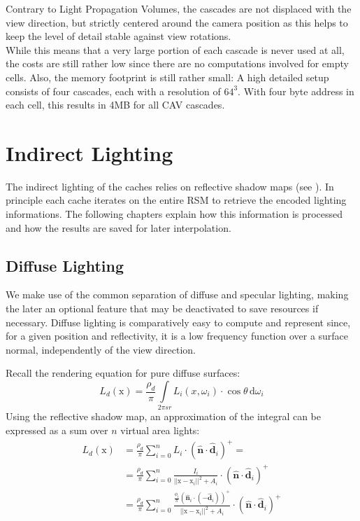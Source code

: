 \documentclass[thesis.tex]{subfiles}
\begin{document}
Contrary to Light Propagation Volumes, the cascades are not displaced with the view direction, but strictly centered around the camera position as this helps to keep the level of detail stable against view rotations.\\
While this means that a very large portion of each cascade is never used at all, the costs are still rather low since there are no computations involved for empty cells.
Also, the memory footprint is still rather small: %
A high detailed setup consists of four cascades, each with a resolution of $64^3$.
With four byte address in each cell, this results in 4MB for all CAV cascades.

\section{Indirect Lighting}
The indirect lighting of the caches relies on reflective shadow maps (see ).
In principle each cache iterates on the entire RSM to retrieve the encoded lighting informations.
The following chapters explain how this information is processed and how the results are saved for later interpolation.

\subsection{Diffuse Lighting}
We make use of the common separation of diffuse and specular lighting, making the later an optional feature that may be deactivated to save resources if necessary. 
Diffuse lighting is comparatively easy to compute and represent since, for a given position and reflectivity, it is a low frequency function over a surface normal, independently of the view direction.

Recall the rendering equation for pure diffuse surfaces:
\begin{equation}
L_d (\mathrm{x}) = \frac{\rho_d}{\pi}\int\limits_{2\pi sr} L_i(x,\omega_i) \cdot \cos\theta \,\mathrm{d}\omega_i
\end{equation}
Using the reflective shadow map, an approximation of the integral can be expressed as a sum over $n$ virtual area lights:
\begin{align}
L_d (\mathrm{x})
&=\frac{\rho_d}{\pi}\sum\limits_{i=0}^{n} L_i \cdot (\hat{\mathbf{n}} \cdot \hat{\mathbf{d}}_i)^+ = \\
&=\frac{\rho_d}{\pi}\sum\limits_{i=0}^{n} \frac{I_i }{||\mathrm{x} - \mathrm{x}_i||^2 +  A_i} \cdot (\hat{\mathbf{n}} \cdot \hat{\mathbf{d}}_i)^+ \\
&=\frac{\rho_d}{\pi}\sum\limits_{i=0}^{n} \frac{\frac{\phi_i}{\pi} (\hat{\mathbf{n}}_i \cdot (-\hat{\mathbf{d}}_i) )^+}{||\mathrm{x} - \mathrm{x}_i||^2 +  A_i} \cdot (\hat{\mathbf{n}} \cdot \hat{\mathbf{d}}_i)^+
\end{align}
\end{document}
